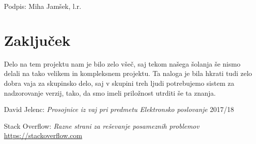 \documentclass[a4paper,12pt]{report}
\newcommand{\tretjiavtor} {Miha Jamšek}
\begin{document}
Podpis: {\tretjiavtor}, l.r.

\chapter{Zaključek}

Delo na tem projektu nam je bilo zelo všeč, saj tekom našega šolanja še nismo delali na tako velikem in kompleksnem projektu. Ta naloga je bila hkrati tudi zelo dobra vaja za skupinsko delo, saj v skupini treh ljudi potrebujemo sistem za nadzorovanje verzij, tako, da smo imeli priložnost utrditi še ta znanja.

\begin{thebibliography}{99}
\addtocounter{chapter}{1}

 David Jelenc: \emph{Prosojnice iz vaj pri predmetu Elektronsko poslovanje} 2017/18

 Stack Overflow: \emph{Razne strani za reševanje posameznih problemov}
\url{https://stackoverflow.com}

\end{thebibliography}
\end{document}
